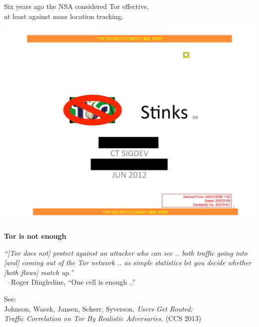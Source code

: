 \documentclass[fleqn,xcolor={usenames,dvipsnames},notes,aspectratio=169]{beamer} %
\begin{document}
\begin{frame}
Six years ago the NSA considered Tor effective, \\
\hspace*{3pt} at least against mass location tracking.

\begin{center}
\includegraphics[page=2,scale=0.35,trim=0 200 0 0,clip]{pics/tor/nsa-tor-stinks.pdf}
\end{center}
\end{frame}




\begin{frame}
\begin{center}
  {\bf Tor is not enough}
\end{center}

\vfill

{\it ``[Tor does not] protect against an attacker who can see .. both traffic going into [and] coming out of the Tor network .. %
as simple statistics let you decide whether [both flows] match up.''}
\\ \ \hfil \normalfont --Roger Dingledine, ``One cell is enough ..''

\vfill

See: \\
\hspace*{3pt} Johnson, Wacek, Jansen, Scherr, Syverson.  {\it Users Get Routed: \\ 
\hspace*{3pt} Traffic Correlation on Tor By Realistic Adversaries.} (CCS 2013)
\end{frame}
\end{document}
